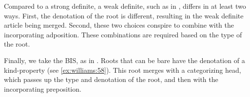 \documentclass[output=paper,
modfonts
]{langscibook}
\begin{document}
Compared to a strong definite, a weak definite, such as in , differs in at least two ways. First, the denotation of the root is different, resulting in the weak definite article  being merged. Second, these two choices conspire to combine with the incorporating adposition. These combinations are required based on the type of the root. 

\begin{exe}
\end{exe}

Finally, we take the BIS, as in . Roots that can be bare have the denotation of a kind-property (see \ref{ex:williams:58}). This root merges with a categorizing head, which passes up the type and denotation of the root, and then with the incorporating preposition.
\end{document}
